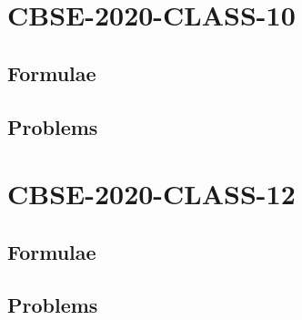 \documentclass[journal]{IEEEtran}
\begin{document}
	\newpage
	
	
	\tableofcontents
	
	\newpage
	\onecolumn
	
	
	\renewcommand{\thetable}{\theenumi}
	
	\section{CBSE-2020-CLASS-10}
	\subsection{Formulae}
	
	\subsection{Problems}
	
	\newpage
	\section{CBSE-2020-CLASS-12}
	\subsection{Formulae}
	
	\subsection{Problems}
	
\end{document}
